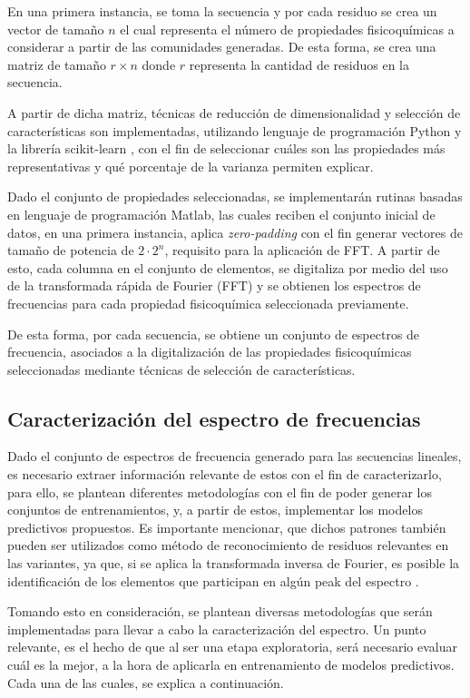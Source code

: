 En una primera instancia, se toma la secuencia y por cada residuo se crea un vector de tamaño $n$ el cual representa el número de propiedades fisicoquímicas a considerar a partir de las comunidades generadas. De esta forma, se crea una matriz de tamaño $r \times n$ donde $r$ representa la cantidad de residuos en la secuencia.


A partir de dicha matriz, técnicas de reducción de dimensionalidad y selección de características son implementadas, utilizando lenguaje de programación Python y la librería scikit-learn \cite{pedregosa2011scikit}, con el fin de seleccionar cuáles son las propiedades más representativas y qué porcentaje de la varianza permiten explicar.

Dado el conjunto de propiedades seleccionadas, se implementarán rutinas basadas en lenguaje de programación Matlab, las cuales reciben el conjunto inicial de datos, en una primera instancia, aplica \textit{zero-padding} con el fin generar vectores de tamaño de potencia de $2\cdot2^n$, requisito para la aplicación de FFT. A partir de esto, cada columna en el conjunto de elementos, se digitaliza por medio del uso de la transformada rápida de Fourier (FFT) y se obtienen los espectros de frecuencias para cada propiedad fisicoquímica seleccionada previamente.

De esta forma, por cada secuencia, se obtiene un conjunto de espectros de frecuencia, asociados a la digitalización de las propiedades fisicoquímicas seleccionadas mediante técnicas de selección de características.

\subsection{Caracterización del espectro de frecuencias}

Dado el conjunto de espectros de frecuencia generado para las secuencias lineales, es necesario extraer información relevante de estos con el fin de caracterizarlo, para ello, se plantean diferentes metodologías con el fin de poder generar los conjuntos de entrenamientos, y, a partir de estos, implementar los modelos predictivos propuestos. Es importante mencionar, que dichos patrones también pueden ser utilizados como método de reconocimiento de residuos relevantes en las variantes, ya que, si se aplica la transformada inversa de Fourier, es posible la identificación de los elementos que participan en algún peak del espectro \cite{veljkovic1985possible}.

Tomando esto en consideración, se plantean diversas metodologías que serán implementadas para llevar a cabo la caracterización del espectro. Un punto relevante, es el hecho de que al ser una etapa exploratoria, será necesario evaluar cuál es la mejor, a la hora de aplicarla en entrenamiento de modelos predictivos. Cada una de las cuales, se explica a continuación.

